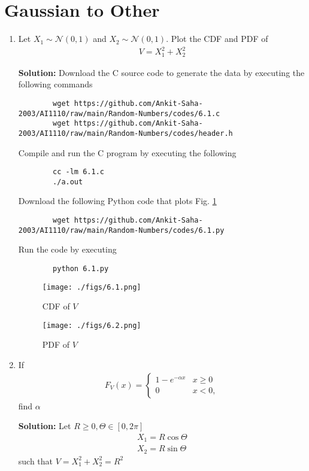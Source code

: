 \documentclass[journal,12pt,twocolumn]{IEEEtran}
\newcommand{\solution}{\noindent \textbf{Solution: }}
\providecommand{\gauss}[2]{\mathcal{N}\ensuremath{\left(#1,#2\right)}}
\numberwithin{equation}{section}
\renewcommand\thesection{\arabic{section}}
\begin{document}
	\section{Gaussian to Other}
	\begin{enumerate}[label=\thesection.\arabic*,ref=\thesection.\theenumi]
	\item Let $X_1 \sim  \gauss{0}{1}$ and $X_2 \sim  \gauss{0}{1}$. Plot the CDF and PDF of
	\begin{align}
		V = X_1^2 + X_2^2
	\end{align}
	
	\solution Download the C source code to generate the data by executing the following commands
	\begin{lstlisting}
		wget https://github.com/Ankit-Saha-2003/AI1110/raw/main/Random-Numbers/codes/6.1.c
		wget https://github.com/Ankit-Saha-2003/AI1110/raw/main/Random-Numbers/codes/header.h
	\end{lstlisting}
	Compile and run the C program by executing the following
	\begin{lstlisting}
		cc -lm 6.1.c
		./a.out
	\end{lstlisting}
	
	Download the following Python code that plots Fig. \ref{fig-6.1} 
	\begin{lstlisting}
		wget https://github.com/Ankit-Saha-2003/AI1110/raw/main/Random-Numbers/codes/6.1.py
	\end{lstlisting}
	Run the code by executing
	\begin{lstlisting}
		python 6.1.py
	\end{lstlisting}
	\begin{figure}
		\centering
		\texttt{[image: ./figs/6.1.png]}
		\caption{CDF of $V$}
		\label{fig-6.1}
	\end{figure}
	\begin{figure}
		\centering
		\texttt{[image: ./figs/6.2.png]}
		\caption{PDF of $V$}
		\label{fig-6.2}
	\end{figure}
	
	\item If
	\begin{align}
		F_{V}(x) = 
		\begin{cases}
			1 - e^{-\alpha x} & x \geq 0 \\
			0 & x < 0,
		\end{cases}	
	\end{align}
	find $\alpha$
	
	\solution Let $R \ge 0, \Theta \in [0, 2\pi]$
	\begin{align}
		X_1 = R\cos\Theta  \\
		X_2 = R\sin\Theta 
	\end{align}
	such that $V = X_1^2 + X_2^2 = R^2$
	 

\end{enumerate}
\end{document}
